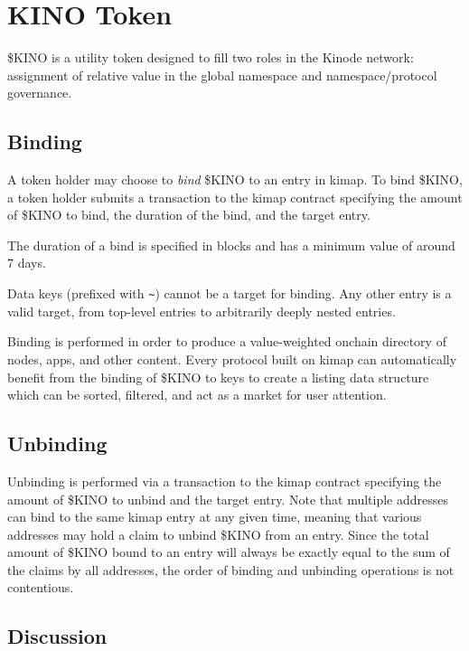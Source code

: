 \documentclass[runningheads]{llncs}
\begin{document}
\section{KINO Token}
\label{sec:kino}

\$KINO is a utility token designed to fill two roles in the Kinode network: assignment of relative value in the global namespace and namespace/protocol governance.

\subsection{Binding}
\label{sec:kinobind}

A token holder may choose to \textit{bind} \$KINO to an entry in kimap.
To bind \$KINO, a token holder submits a transaction to the kimap contract specifying the amount of \$KINO to bind, the duration of the bind, and the target entry.

The duration of a bind is specified in blocks and has a minimum value of around 7 days.

Data keys (prefixed with \verb|~|) cannot be a target for binding.
Any other entry is a valid target, from top-level entries to arbitrarily deeply nested entries.

Binding is performed in order to produce a value-weighted onchain directory of nodes, apps, and other content.
Every protocol built on kimap can automatically benefit from the binding of \$KINO to keys to create a listing data structure which can be sorted, filtered, and act as a market for user attention.

\subsection{Unbinding}
\label{sec:kinounbind}

Unbinding is performed via a transaction to the kimap contract specifying the amount of \$KINO to unbind and the target entry.
Note that multiple addresses can bind to the same kimap entry at any given time, meaning that various addresses may hold a claim to unbind \$KINO from an entry.
Since the total amount of \$KINO bound to an entry will always be exactly equal to the sum of the claims by all addresses, the order of binding and unbinding operations is not contentious.

\subsection{Discussion}
\label{sec:kinodiscussion}
\end{document}
